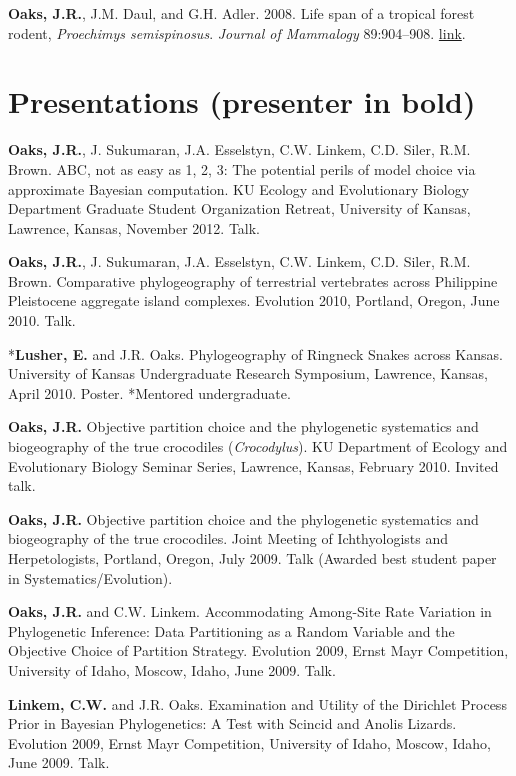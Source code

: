 \documentclass[10pt]{article}
\newcommand{\myHangIndent}{\hangindent=5mm}
\begin{document}
\begin{thebibliography}{6}
{\bf Oaks, J.R.}, J.M. Daul, and G.H. Adler. 2008.
\newblock Life span of a tropical forest rodent, \emph{{P}roechimys
  semispinosus}.
\newblock \emph{Journal of Mammalogy} 89:904--908.
\newblock \href{http://dx.doi.org/10.1644/07-MAMM-A-045.1}{link}.

\end{thebibliography}

\section*{Presentations (presenter in bold)}
\myHangIndent
{\bf Oaks, J.R.}, J. Sukumaran, J.A. Esselstyn, C.W. Linkem, C.D. Siler, R.M.
Brown.
ABC, not as easy as 1, 2, 3: The potential perils of model choice via
approximate Bayesian computation.
KU Ecology and Evolutionary Biology Department Graduate Student Organization
Retreat, University of Kansas, Lawrence, Kansas, November 2012.
Talk.

\myHangIndent
{\bf Oaks, J.R.}, J. Sukumaran, J.A. Esselstyn, C.W. Linkem, C.D. Siler, R.M.
Brown.
Comparative phylogeography of terrestrial vertebrates across Philippine
Pleistocene aggregate island complexes.
Evolution 2010, Portland, Oregon, June 2010.
Talk.

\myHangIndent
*{\bf Lusher, E.} and J.R. Oaks.
Phylogeography of Ringneck Snakes across Kansas.
University of Kansas Undergraduate Research Symposium, Lawrence, Kansas, April
2010.
Poster.
*Mentored undergraduate.

\myHangIndent
{\bf Oaks, J.R.}
Objective partition choice and the phylogenetic systematics and biogeography of
the true crocodiles (\emph{Crocodylus}).
KU Department of Ecology and Evolutionary Biology Seminar Series, Lawrence,
Kansas, February 2010.
Invited talk.

\myHangIndent
{\bf Oaks, J.R.}
Objective partition choice and the phylogenetic systematics and biogeography of
the true crocodiles.
Joint Meeting of Ichthyologists and Herpetologists, Portland, Oregon, July
2009.
Talk (Awarded best student paper in Systematics/Evolution).

\myHangIndent
{\bf Oaks, J.R.} and C.W. Linkem.
Accommodating Among-Site Rate Variation in Phylogenetic Inference: Data
Partitioning as a Random Variable and the Objective Choice of Partition
Strategy.
Evolution 2009, Ernst Mayr Competition, University of Idaho, Moscow, Idaho,
June 2009.
Talk.

\myHangIndent
{\bf Linkem, C.W.} and J.R. Oaks.
Examination and Utility of the Dirichlet Process Prior in Bayesian
Phylogenetics: A Test with Scincid and Anolis Lizards.
Evolution 2009, Ernst Mayr Competition, University of Idaho, Moscow, Idaho,
June 2009.
Talk.
\end{document}
